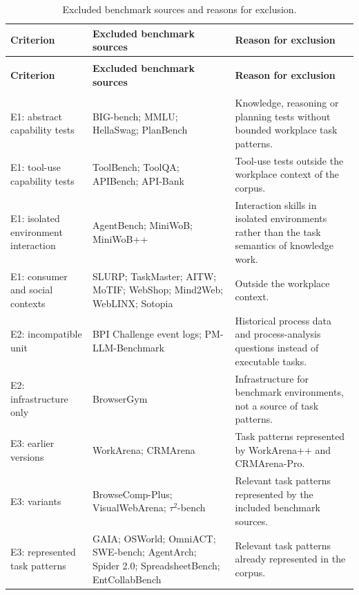 \begingroup
\renewcommand{\baselinestretch}{1}
\small
\setlength{\tabcolsep}{4pt}
\renewcommand{\arraystretch}{1.08}
\begin{longtable}{>{\raggedright\arraybackslash}p{} >{\raggedright\arraybackslash}p{} >{\raggedright\arraybackslash}p{}}
\caption[Excluded benchmark sources and reasons for exclusion]{Excluded benchmark sources and reasons for exclusion.}\label{tab:app-screening} \\
\toprule
\textbf{Criterion} & \textbf{Excluded benchmark sources} & \textbf{Reason for exclusion} \\
\midrule
\endfirsthead
\multicolumn{3}{l}{\tablename~\thetable{} (continued)} \\
\toprule
\textbf{Criterion} & \textbf{Excluded benchmark sources} & \textbf{Reason for exclusion} \\
\midrule
\endhead
\midrule
\multicolumn{3}{r}{\emph{Continued on the next page.}} \\
\endfoot
\bottomrule
\endlastfoot
E1: abstract capability tests & BIG-bench; MMLU; HellaSwag; PlanBench & Knowledge, reasoning or planning tests without bounded workplace task patterns. \\
\addlinespace[2.5pt]
E1: tool-use capability tests & ToolBench; ToolQA; APIBench; API-Bank & Tool-use tests outside the workplace context of the corpus. \\
\addlinespace[2.5pt]
E1: isolated environment interaction & AgentBench; MiniWoB; MiniWoB++ & Interaction skills in isolated environments rather than the task semantics of knowledge work. \\
\addlinespace[2.5pt]
E1: consumer and social contexts & SLURP; TaskMaster; AITW; MoTIF; WebShop; Mind2Web; WebLINX; Sotopia & Outside the workplace context. \\
\addlinespace[2.5pt]
E2: incompatible unit & BPI Challenge event logs; PM-LLM-Benchmark & Historical process data and process-analysis questions instead of executable tasks. \\
\addlinespace[2.5pt]
E2: infrastructure only & BrowserGym & Infrastructure for benchmark environments, not a source of task patterns. \\
\addlinespace[2.5pt]
E3: earlier versions & WorkArena; CRMArena & Task patterns represented by WorkArena++ and CRMArena-Pro. \\
\addlinespace[2.5pt]
E3: variants & BrowseComp-Plus; VisualWebArena; $\tau^2$-bench & Relevant task patterns represented by the included benchmark sources. \\
\addlinespace[2.5pt]
E3: represented task patterns & GAIA; OSWorld; OmniACT; SWE-bench; AgentArch; Spider 2.0; SpreadsheetBench; EntCollabBench & Relevant task patterns already represented in the corpus. \\
\end{longtable}
\endgroup

